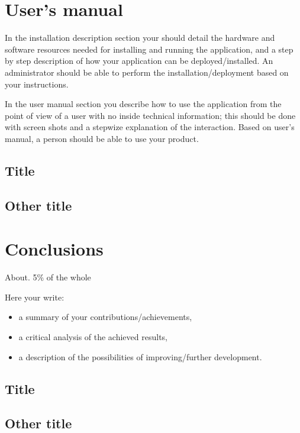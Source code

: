 \documentclass[12pt,a4paper,twoside]{report}
\begin{document}
\chapter{User's manual}

In the installation description section your should detail the hardware and software resources needed for installing and running the application, and a step by step description of how your application can be deployed/installed. An administrator should be able to perform the installation/deployment based on your instructions.

In the user manual section you describe how to use the application from the point of view of a user with no inside technical information; this should be done with screen shots and a stepwize explanation of the interaction. Based on user's manual, a person should be able to use your product.

\section{Title}
\section{Other title}

\chapter{Conclusions}

About. 5\% of the whole

Here your write:
\begin{itemize}
\item a summary of your contributions/achievements,
\item a critical analysis of the achieved results,
\item a description of the possibilities of improving/further development.
\end{itemize}
\section{Title}
\section{Other title}


 


\end{document}
